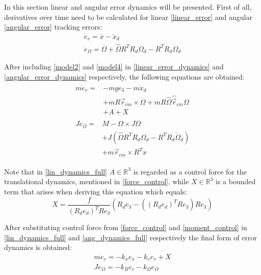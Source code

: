 In this section linear and angular error dynamics will be presented. First of all, derivatives over time need to be calculated for linear \ref{linear_error} and angular \ref{angular_error} tracking errors:
\begin{gather}
	\dot{e}_v = \ddot{x} - \ddot{x}_d \label{linear_error_dynamics}\\
	\dot{e}_\Omega = \dot{\Omega} + \hat{\Omega}R^TR_d\Omega_d - R^TR_d\dot{\Omega}_d \label{angular_error_dynamics}
\end{gather}

\noindent After including \ref{model2} and \ref{model4} in \ref{linear_error_dynamics} and \ref{angular_error_dynamics} respectively, the following equations are obtained:
\begin{align}
	\label{lin_dynamics_full}
	\begin{split}
		m\dot{e}_v = & - mge_3 - m\ddot{x}_d \\
			&+ mR\vec{r}_{cm}  \times \dot{\Omega} + mR\hat{\Omega}\hat{\vec{r}}_{cm}\Omega \\
			&+ A + X	
	\end{split} \\
	\label{ang_dynamics_full}
	\begin{split}
		J\dot{e}_\Omega = &M - \Omega \times J\Omega \\
			&+ J(\hat{\Omega}R^TR_d\Omega_d - R^TR_d\dot{\Omega}_d) \\
			&+ m\vec{r}_{cm} \times R^T \ddot{x}
	\end{split}
\end{align}

\noindent Note that in \ref{lin_dynamics_full} $A\in \mathbb{R}^3$ is regarded as a control force for the translational dynamics, mentioned in \ref{force_control}, while $X\in\mathbb{R}^3$ is a bounded term that arises when deriving this equation which equals:
\begin{equation}
	X = \frac{f}{(R_de_d)^TRe_3}(R_d e_3 - ((R_de_d)^TRe_3)Re_3)
\end{equation}

\noindent After substituting control force from \ref{force_control} and \ref{moment_control} in \ref{lin_dynamics_full} and \ref{ang_dynamics_full} respectively the final form of error dynamics is obtained:
\begin{gather}
	m\dot{e}_v = -k_x e_x - k_v e_v + X \\
	J\dot{e}_\Omega = -k_R e_r - k_\Omega e_\Omega
\end{gather}

